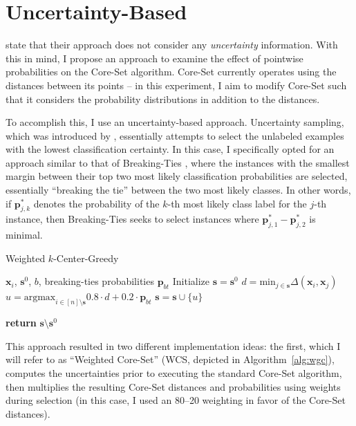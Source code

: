 \documentclass[english,bachelor,ul]{webisthesis} %
\begin{document}
\section{Uncertainty-Based}

\cite{DBLP:conf/iclr/SenerS18} state that their approach does not consider any \textit{uncertainty} information. With this in mind, I propose an approach to examine the effect of pointwise probabilities on the Core-Set algorithm. Core-Set currently operates using the distances between its points -- in this experiment, I aim to modify Core-Set such that it considers the probability distributions in addition to the distances. 

To accomplish this, I use an uncertainty-based approach. Uncertainty sampling, which was introduced by \cite{DBLP:conf/sigir/LewisG94}, essentially attempts to select the unlabeled examples with the lowest classification certainty. In this case, I specifically opted for an approach similar to that of Breaking-Ties \citep{DBLP:journals/jmlr/LuoKGHSRH05}, where the instances with the smallest margin between their top two most likely classification probabilities are selected, essentially ``breaking the tie'' between the two most likely classes. In other words, if $ \mathbf{p}_{j, k}^* $ denotes the probability of the $ k $-th most likely class label for the $ j $-th instance, then Breaking-Ties seeks to select instances where $ \mathbf{p}_{j, 1}^* - \mathbf{p}_{j, 2}^* $ is minimal.

\begin{algorithm}[htpb]
\caption{Weighted $k$-Center-Greedy}%
\label{alg:wgc}
\begin{algorithmic}

\Require $ \mathbf{x}_i $, $ \mathbf{s}^0 $, $ b $, breaking-ties probabilities $ \mathbf{p}_{bt} $
\State Initialize $ \mathbf{s} = \mathbf{s}^0 $
\Repeat
\State $ d = \text{min}_{j \in \mathbf{s}} \Delta(\mathbf{x}_i, \mathbf{x}_j) $ 
    \State $ u = \text{argmax}_{i \in [n] \setminus \mathbf{s}} 0.8 \cdot d + 0.2 \cdot \mathbf{p}_{bt} $
\State $ \mathbf{s} = \mathbf{s} \cup \{u\} $

\State \textbf{return} $\mathbf{s} \setminus \mathbf{s}^0 $
\end{algorithmic}
\end{algorithm}

This approach resulted in two different implementation ideas: the first, which I will refer to as ``Weighted Core-Set'' (WCS, depicted in Algorithm~\ref{alg:wgc}), computes the uncertainties prior to executing the standard Core-Set algorithm, then multiplies the resulting Core-Set distances and probabilities using weights during selection (in this case, I used an 80--20 weighting in favor of the Core-Set distances).
\end{document}
